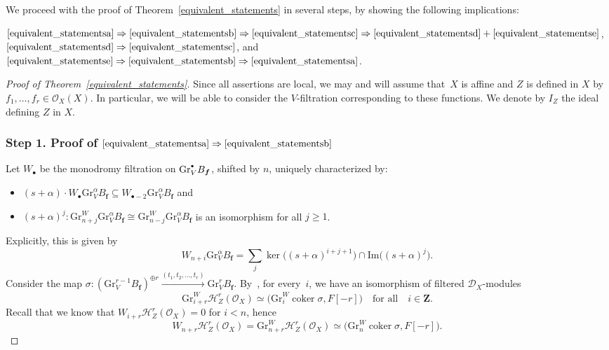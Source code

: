 \documentclass[JEP,XML,SOM,Unicode]{cedram}
\newcommand{\sbullet}{{\scriptscriptstyle\bullet}}
\newcommand{\csbullet}{{\raisebox{1pt}{$\sbullet$}}}
\newcommand{\DXmodules}{$\cD_X$\nobreakdash-mod\-ules\xspace}
\theoremstyle{plain}
\theoremstyle{definition}
\newcommand\Z{{\mathbf Z}}
\newcommand\cD{\mathcal{D}}
\newcommand\cH{\mathcal{H}}
\newcommand\cO{\mathcal{O}}
\newcommand\cH{\mathcal{H}}
\newcommand\cO{\mathcal{O}}
\newcommand\bff{{\boldsymbol f}}
\newcommand\gr{\mathrm{Gr}}
\DeclareMathOperator{\coker}{coker}
\begin{document}
We proceed with the proof of Theorem~\ref{equivalent_statements} in several steps, by showing the following implications:

$\eqref{equivalent_statementsa}\Rightarrow \eqref{equivalent_statementsb} \Rightarrow \eqref{equivalent_statementsc}\Rightarrow \eqref{equivalent_statementsd}+\eqref{equivalent_statementse}$, $\eqref{equivalent_statementsd}\Rightarrow\eqref{equivalent_statementsc}$, and $\eqref{equivalent_statementse}\Rightarrow \eqref{equivalent_statementsb} \Rightarrow \eqref{equivalent_statementsa}$.

\begin{proof}[Proof of Theorem~\ref{equivalent_statements}]
Since all assertions are local, we may and will assume that~$X$ is affine and $Z$ is defined in $X$ by $f_1,\ldots,f_r\in\cO_X(X)$.
In particular, we will be able to consider the $V$-filtration corresponding to these functions. We denote by $I_Z$
the ideal defining $Z$ in $X$.

\subsubsection*{Step 1. Proof of $\eqref{equivalent_statementsa}\Rightarrow\eqref{equivalent_statementsb}$}
Let $W_\sbullet$ be the monodromy filtration on $\gr^\csbullet_V B_\bff$, shifted by $n$, uniquely characterized by:
\begin{itemize}
\item $(s+\alpha)\cdot W_\sbullet\gr_V^{\alpha}B_{\bff} \subseteq W_{\sbullet-2}\gr_V^{\alpha}B_{\bff}$ and
\item $(s+\alpha)^j\colon \gr^W_{n+j}\gr_V^{\alpha}B_{\bff} \cong \gr^W_{n-j}\gr_V^{\alpha}B_{\bff}$ is an isomorphism
for all $j\geq 1$.
\end{itemize}
Explicitly, this is given by
\begin{equation}\label{monodromy}
W_{n+i}\gr_V^{\alpha}B_{\bff}=\sum_j\ker\big((s+\alpha)^{i+j+1}\big)\cap \mathrm{Im}\big((s+\alpha)^{j}\big).
\end{equation}
Consider the map $\sigma\colon \left(\gr^{r-1}_V B_\bff\right)^{\oplus r} \xrightarrow{(t_1,t_2,\dots,t_r)} \gr^{r}_V B_\bff$.
By~\cite[Th.\,1.2]{CD}, for every~$i$, we have an isomorphism of filtered \DXmodules
\begin{equation}\label{eq:sigma}
\gr^W_{i+r}\cH^r_Z(\cO_X)\simeq \big(\gr^W_i\coker \sigma, F[-r]\big)\quad\text{for all}\quad i\in\Z.
\end{equation}
Recall that we know that $W_{i+r}\cH^r_Z(\cO_X)=0$ for $i<n$, hence
\begin{equation}\label{eqW}
W_{n+r}\cH^r_Z(\cO_X)=\gr^W_{n+r}\cH^r_Z(\cO_X)\simeq \big(\gr^W_n\coker \sigma, F[-r]\big).
\end{equation}


\end{proof}
\end{document}
